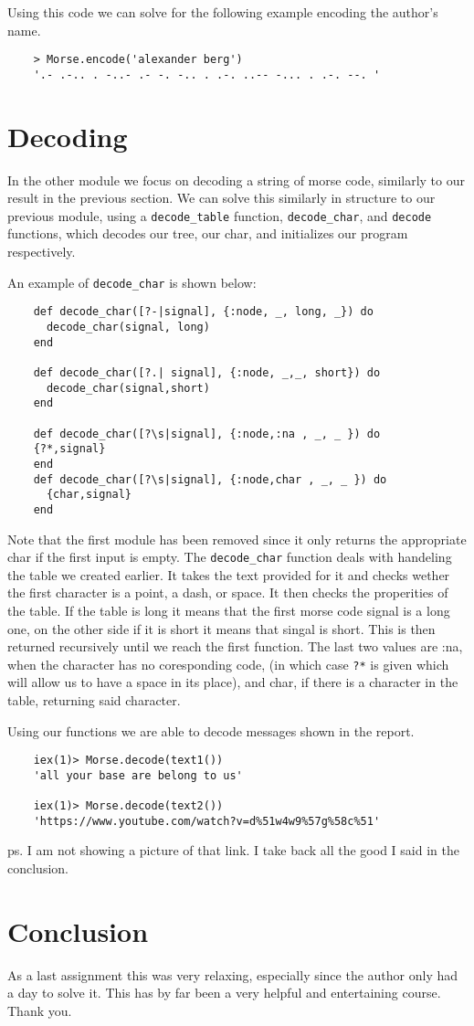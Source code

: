 \documentclass[a4paper,11pt]{article}
\begin{document}
Using this code we can solve for the following example encoding the author's name.

\begin{verbatim}
    > Morse.encode('alexander berg')
    '.- .-.. . -..- .- -. -.. . .-. ..-- -... . .-. --. '
\end{verbatim}

\section*{Decoding}

In the other module we focus on decoding a string of morse code, similarly to our result in the previous section. We can solve this similarly in structure to our previous module, using a {\tt decode\_table} function, {\tt decode\_char}, and {\tt decode} functions, which decodes our tree, our char, and initializes our program respectively.

An example of {\tt decode\_char} is shown below:

\begin{verbatim}
    def decode_char([?-|signal], {:node, _, long, _}) do
      decode_char(signal, long)
    end

    def decode_char([?.| signal], {:node, _,_, short}) do
      decode_char(signal,short)
    end
  
    def decode_char([?\s|signal], {:node,:na , _, _ }) do
    {?*,signal}
    end
    def decode_char([?\s|signal], {:node,char , _, _ }) do
      {char,signal}
    end
\end{verbatim}

Note that the first module has been removed since it only returns the appropriate char if the first input is empty. The {\tt decode\_char} function deals with handeling the table we created earlier. It takes the text provided for it and checks wether the first character is a point, a dash, or space. It then checks the properities of the table. If the table is long it means that the first morse code signal is a long one, on the other side if it is short it means that singal is short. This is then returned recursively until we reach the first function. The last two values are :na, when the character has no coresponding code, (in which case {\tt ?*} is given which will allow us to have a space in its place), and char, if there is a character in the table, returning said character. 

Using our functions we are able to decode messages shown in the report. 
\begin{verbatim}
    iex(1)> Morse.decode(text1())
    'all your base are belong to us'

    iex(1)> Morse.decode(text2())
    'https://www.youtube.com/watch?v=d%51w4w9%57g%58c%51'
\end{verbatim}

ps. I am not showing a picture of that link. I take back all the good I said in the conclusion.

\section*{Conclusion}

As a last assignment this was very relaxing, especially since the author only had a day to solve it. This has by far been a very helpful and entertaining course. Thank you.
\end{document}
